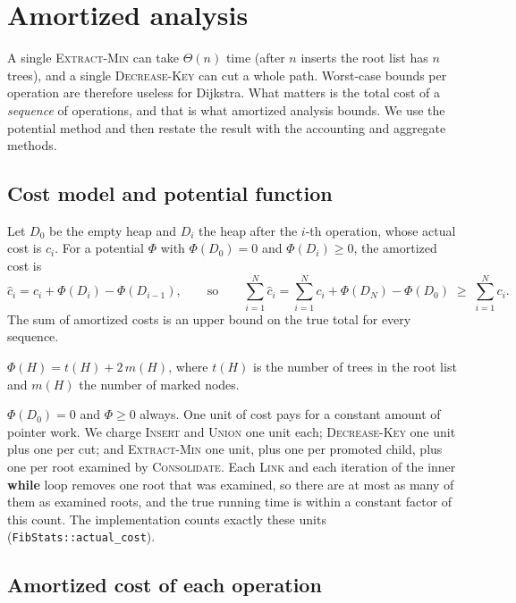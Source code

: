 \section{Amortized analysis}\label{sec:amortized}

A single \textsc{Extract-Min} can take \(\Theta(n)\) time (after \(n\) inserts the root list has \(n\) trees), and a
single \textsc{Decrease-Key} can cut a whole path. Worst-case bounds per operation are therefore useless for
Dijkstra. What matters is the total cost of a \emph{sequence} of operations, and that is what amortized analysis
bounds. We use the potential method and then restate the result with the accounting and aggregate methods.

\subsection{Cost model and potential function}
Let \(D_0\) be the empty heap and \(D_i\) the heap after the \(i\)-th operation, whose actual cost is \(c_i\). For a
potential \(\Phi\) with \(\Phi(D_0)=0\) and \(\Phi(D_i)\ge0\), the amortized cost is
\[\hat c_i = c_i+\Phi(D_i)-\Phi(D_{i-1}),\qquad\text{so}\qquad
\sum_{i=1}^{N}\hat c_i=\sum_{i=1}^{N}c_i+\Phi(D_N)-\Phi(D_0)\;\ge\;\sum_{i=1}^{N}c_i .\]
The sum of amortized costs is an upper bound on the true total for every sequence.

\begin{definition}[potential]\label{def:phi}
\(\Phi(H)=t(H)+2\,m(H)\), where \(t(H)\) is the number of trees in the root list and \(m(H)\) the number of marked nodes.
\end{definition}

\noindent\(\Phi(D_0)=0\) and \(\Phi\ge0\) always. One unit of cost pays for a constant amount of pointer work. We
charge \textsc{Insert} and \textsc{Union} one unit each; \textsc{Decrease-Key} one unit plus one per cut; and
\textsc{Extract-Min} one unit, plus one per promoted child, plus one per root examined by \textsc{Consolidate}.
Each \textsc{Link} and each iteration of the inner \textbf{while} loop removes one root that was examined, so
there are at most as many of them as examined roots, and the true running time is within a constant factor of this
count. The implementation counts exactly these units (\texttt{FibStats::actual\_cost}).

\subsection{Amortized cost of each operation}


